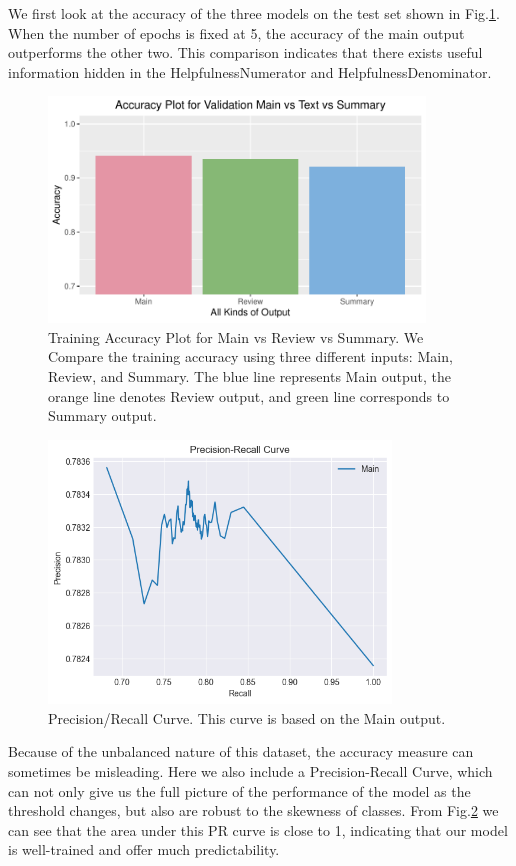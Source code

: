 \documentclass[letterpaper]{article} %
\begin{document}
We first look at the accuracy of the three models on the test set shown in Fig.\ref{1}. When the number of epochs is fixed at 5, the accuracy of the main output outperforms the other two. This comparison indicates that there exists useful information hidden in the HelpfulnessNumerator and HelpfulnessDenominator.

\begin{figure}[!h]
\centering
\includegraphics[height=6cm,width=0.9\columnwidth]{report/plot_val_acc.pdf}  
\caption{Training Accuracy Plot for Main vs Review vs Summary. We Compare the training accuracy using three different inputs: Main, Review, and Summary. The blue line represents Main output, the orange line denotes Review output, and green line corresponds to Summary output.}
\label{1}
\end{figure}


\begin{figure}[!h]
\centering
\includegraphics[height=7cm,width=0.9\columnwidth]{report/pr_curve.png}  
\caption{Precision/Recall Curve. This curve is based on the Main output.}
\label{3}
\end{figure}

Because of the unbalanced nature of this dataset, the accuracy measure can sometimes be misleading. Here we also include a Precision-Recall Curve, which can not only give us the full picture of the performance of the model as the threshold changes, but also are robust to the skewness of classes. From Fig.\ref{3} we can see that the area under this PR curve is close to 1, indicating that our model is well-trained and offer much predictability.
\end{document}
